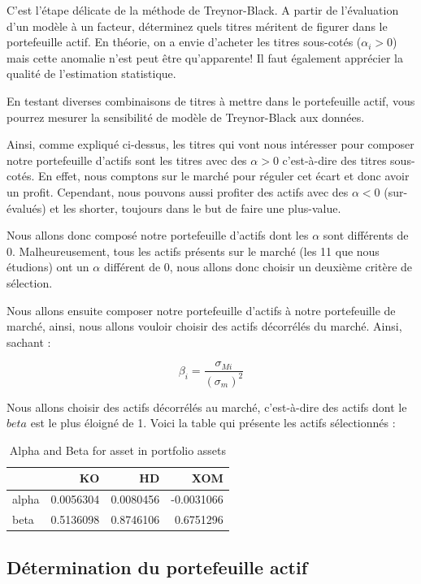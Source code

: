 \documentclass[
]{article}
\begin{document}
C'est l'étape délicate de la méthode de Treynor-Black. A partir de
l'évaluation d'un modèle à un facteur, déterminez quels titres méritent
de figurer dans le portefeuille actif. En théorie, on a envie d'acheter
les titres sous-cotés (\(\alpha_i > 0\)) mais cette anomalie n'est peut
être qu'apparente! Il faut également apprécier la qualité de
l'estimation statistique.

En testant diverses combinaisons de titres à mettre dans le portefeuille
actif, vous pourrez mesurer la sensibilité de modèle de Treynor-Black
aux données.

Ainsi, comme expliqué ci-dessus, les titres qui vont nous intéresser
pour composer notre portefeuille d'actifs sont les titres avec des
\(\alpha > 0\) c'est-à-dire des titres sous-cotés. En effet, nous
comptons sur le marché pour réguler cet écart et donc avoir un profit.
Cependant, nous pouvons aussi profiter des actifs avec des
\(\alpha < 0\) (sur-évalués) et les shorter, toujours dans le but de
faire une plus-value.

Nous allons donc composé notre portefeuille d'actifs dont les \(\alpha\)
sont différents de 0. Malheureusement, tous les actifs présents sur le
marché (les 11 que nous étudions) ont un \(\alpha\) différent de 0, nous
allons donc choisir un deuxième critère de sélection.

Nous allons ensuite composer notre portefeuille d'actifs à notre
portefeuille de marché, ainsi, nous allons vouloir choisir des actifs
décorrélés du marché. Ainsi, sachant :

\[
\beta_i = \frac{\sigma_{Mi}}{(\sigma_m)^2}
\]

Nous allons choisir des actifs décorrélés au marché, c'est-à-dire des
actifs dont le \(beta\) est le plus éloigné de 1. Voici la table qui
présente les actifs sélectionnés :

\begin{table}[H]

\caption{\label{tab:unnamed-chunk-9}Alpha and Beta for asset in portfolio assets}
\centering
\begin{tabular}[t]{lrrr}
\toprule
  & KO & HD & XOM\\
\midrule
alpha & 0.0056304 & 0.0080456 & -0.0031066\\
beta & 0.5136098 & 0.8746106 & 0.6751296\\
\bottomrule
\end{tabular}
\end{table}

\hypertarget{duxe9termination-du-portefeuille-actif}{%
\subsection{Détermination du portefeuille
actif}\label{duxe9termination-du-portefeuille-actif}}
\end{document}
